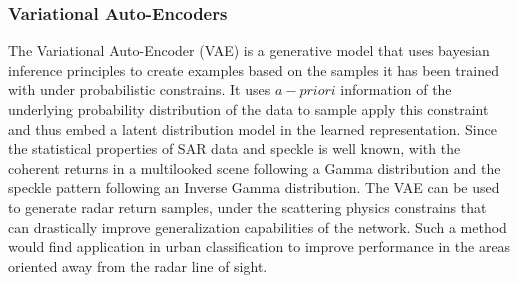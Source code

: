 \subsubsection*{Variational Auto-Encoders}
The Variational Auto-Encoder (VAE) is a generative model that uses bayesian inference principles to create examples based on the samples it has been trained with under probabilistic constrains. It uses $a-priori$ information of the underlying probability distribution of the data to sample apply this constraint and thus embed a latent distribution model in the learned representation. Since the statistical properties of SAR data and speckle is well known, with the coherent returns in a multilooked scene following a Gamma distribution and the speckle pattern following an Inverse Gamma distribution. The VAE can be used to generate radar return samples, under the scattering physics constrains that can drastically improve generalization capabilities of the network. Such a method would find application in urban classification to improve performance in the areas oriented away from the radar line of sight. 
